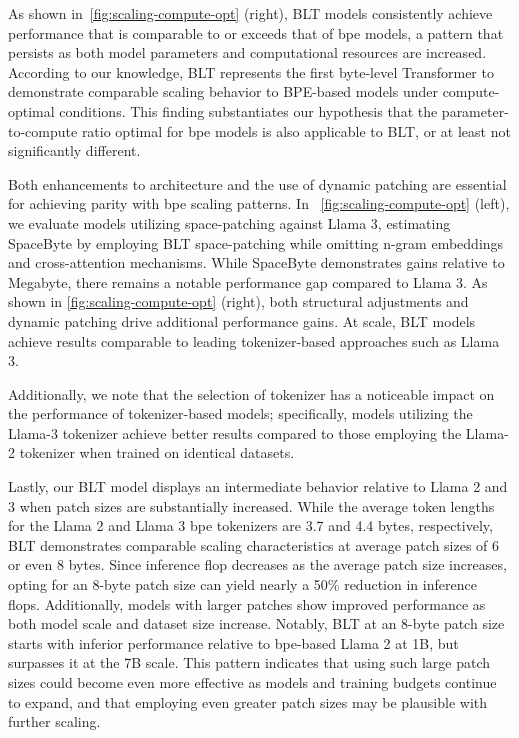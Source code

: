 As shown in~\autoref{fig:scaling-compute-opt} (right), {\textsc BLT} models consistently achieve performance that is comparable to or exceeds that of bpe models, a pattern that persists as both model parameters and computational resources are increased. According to our knowledge, {\textsc BLT} represents the first byte-level Transformer to demonstrate comparable scaling behavior to BPE-based models under compute-optimal conditions. This finding substantiates our hypothesis that the parameter-to-compute ratio optimal for bpe models is also applicable to {\textsc BLT}, or at least not significantly different.

Both enhancements to architecture and the use of dynamic patching are essential for achieving parity with bpe scaling patterns. In ~\autoref{fig:scaling-compute-opt} (left), we evaluate models utilizing space-patching against Llama 3, estimating SpaceByte \citep{slagle2024spacebyte} by employing {\textsc BLT} space-patching while omitting n-gram embeddings and cross-attention mechanisms. While SpaceByte demonstrates gains relative to Megabyte, there remains a notable performance gap compared to Llama 3. As shown in \autoref{fig:scaling-compute-opt} (right), both structural adjustments and dynamic patching drive additional performance gains. At scale, {\textsc BLT} models achieve results comparable to leading tokenizer-based approaches such as Llama 3.

Additionally, we note that the selection of tokenizer has a noticeable impact on the performance of tokenizer-based models; specifically, models utilizing the Llama-3 tokenizer achieve better results compared to those employing the Llama-2 tokenizer when trained on identical datasets.

Lastly, our {\textsc BLT} model displays an intermediate behavior relative to Llama 2 and 3 when patch sizes are substantially increased. While the average token lengths for the Llama 2 and Llama 3 bpe tokenizers are 3.7 and 4.4 bytes, respectively, {\textsc BLT} demonstrates comparable scaling characteristics at average patch sizes of 6 or even 8 bytes. Since inference flop decreases as the average patch size increases, opting for an 8-byte patch size can yield nearly a 50\% reduction in inference flops. Additionally, models with larger patches show improved performance as both model scale and dataset size increase. Notably, {\textsc BLT} at an 8-byte patch size starts with inferior performance relative to bpe-based Llama 2 at 1B, but surpasses it at the 7B scale. This pattern indicates that using such large patch sizes could become even more effective as models and training budgets continue to expand, and that employing even greater patch sizes may be plausible with further scaling.

